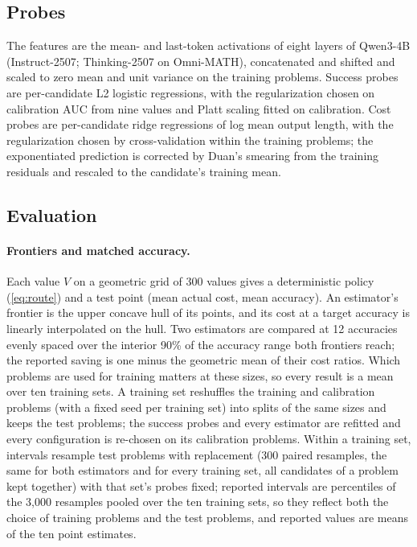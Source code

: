 \documentclass[10pt]{article}
\begin{document}
\subsection{Probes}
The features are the mean- and last-token activations of eight layers of Qwen3-4B (Instruct-2507; Thinking-2507 on Omni-MATH), concatenated and shifted and scaled to zero mean and unit variance on the training problems. Success probes are per-candidate L2 logistic regressions, with the regularization chosen on calibration AUC from nine values and Platt scaling fitted on calibration. Cost probes are per-candidate ridge regressions of log mean output length, with the regularization chosen by cross-validation within the training problems; the exponentiated prediction is corrected by Duan's smearing from the training residuals and rescaled to the candidate's training mean.

\subsection{Evaluation}
\paragraph{Frontiers and matched accuracy.} Each value $V$ on a geometric grid of 300 values gives a deterministic policy (\cref{eq:route}) and a test point (mean actual cost, mean accuracy). An estimator's frontier is the upper concave hull of its points, and its cost at a target accuracy is linearly interpolated on the hull. Two estimators are compared at 12 accuracies evenly spaced over the interior 90\% of the accuracy range both frontiers reach; the reported saving is one minus the geometric mean of their cost ratios. Which problems are used for training matters at these sizes, so every result is a mean over ten training sets. A training set reshuffles the training and calibration problems (with a fixed seed per training set) into splits of the same sizes and keeps the test problems; the success probes and every estimator are refitted and every configuration is re-chosen on its calibration problems. Within a training set, intervals resample test problems with replacement (300 paired resamples, the same for both estimators and for every training set, all candidates of a problem kept together) with that set's probes fixed; reported intervals are percentiles of the 3,000 resamples pooled over the ten training sets, so they reflect both the choice of training problems and the test problems, and reported values are means of the ten point estimates.
\end{document}
